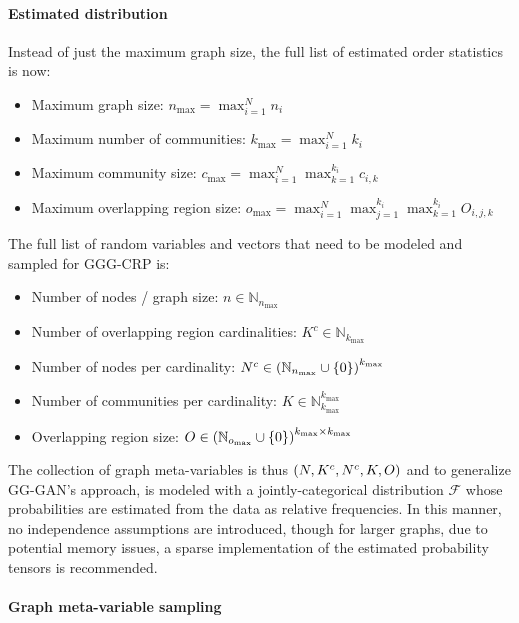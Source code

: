\paragraph{Estimated distribution}
Instead of just the maximum graph size, the full list of estimated order statistics is now:
\begin{itemize}
\item Maximum graph size: $n_{\max}=\max_{i=1}^{N}{n_i}$
\item Maximum number of communities: $k_{\max}=\max_{i=1}^{N}{k_i}$
\item Maximum community size: $c_{\max}=\max_{i=1}^{N}\max_{k=1}^{k_i}{c_{i,k}}$
\item Maximum overlapping region size: $o_{\max}=\max_{i=1}^{N}\max_{j=1}^{k_i}\max_{k=1}^{k_i}{O_{i,j,k}}$
\end{itemize}

The full list of random variables and vectors that need to be modeled and sampled for GGG-CRP is:

\begin{itemize}
\item Number of nodes / graph size: $n \in \mathbb{N}_{n_{\max}}$
\item Number of overlapping region cardinalities: $K^c \in \mathbb{N}_{k_{\max}}$
\item Number of nodes per cardinality: $N^c \in \mathopen{}\left(\mathbb{N}_{n_{\max}} \cup \mathopen{}\left\{0\right\}\right)^{k_{\max}}$
\item Number of communities per cardinality: $K \in \mathbb{N}_{k_{\max}}^{k_{\max}}$
\item Overlapping region size: $O \in \mathopen{}\left(\mathbb{N}_{o_{\max}} \cup \mathopen{}\left\{0\right\}\right)^{k_{\max} \times k_{\max}}$
\end{itemize}

The collection of graph meta-variables is thus $\mathopen{}\left(N, K^c, N^c, K, O\right)$ and to generalize GG-GAN's approach, is modeled with a jointly-categorical distribution $\mathcal{F}$ whose probabilities are estimated from the data as relative frequencies. In this manner, no independence assumptions are introduced, though for larger graphs, due to potential memory issues, a sparse implementation of the estimated probability tensors is recommended.

\paragraph{Graph meta-variable sampling}

